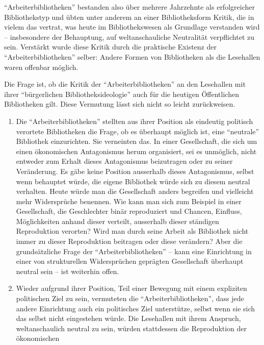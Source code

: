 \documentclass[a4paper,
fontsize=11pt,
oneside,
numbers=noperiodatend,
parskip=half-,
bibliography=totoc,
final
]{scrartcl}
\begin{document}
\enquote{Arbeiterbibliotheken} bestanden also über mehrere Jahrzehnte
als erfolgreicher Bibliothekstyp und übten unter anderem an einer
Bibliotheksform Kritik, die in vielem das vertrat, was heute im
Bibliothekswesen als Grundlage verstanden wird -- insbesondere der
Behauptung, auf weltanschauliche Neutralität verpflichtet zu sein.
Verstärkt wurde diese Kritik durch die praktische Existenz der
\enquote{Arbeiterbibliotheken} selber: Andere Formen von Bibliotheken
als die Lesehallen waren offenbar möglich.

Die Frage ist, ob die Kritik der \enquote{Arbeiterbibliotheken} an den
Lesehallen mit ihrer \enquote{bürgerlichen Bibliotheksideologie} auch
für die heutigen Öffentlichen Bibliotheken gilt. Diese Vermutung lässt
sich nicht so leicht zurückweisen.

\begin{enumerate}
\def\labelenumi{(\arabic{enumi})}
\item
  Die \enquote{Arbeiterbibliotheken} stellten aus ihrer Position als
  eindeutig politisch verortete Bibliotheken die Frage, ob es überhaupt
  möglich ist, eine \enquote{neutrale} Bibliothek einzurichten. Sie
  verneinten das. In einer Gesellschaft, die sich um einen ökonomischen
  Antagonismus herum organisiert, sei es unmöglich, nicht entweder zum
  Erhalt dieses Antagonismus beizutragen oder zu seiner Veränderung. Es
  gäbe keine Position ausserhalb dieses Antagonismus, selbst wenn
  behauptet würde, die eigene Bibliothek würde sich zu diesem neutral
  verhalten. Heute würde man die Gesellschaft anders begreifen und
  vielleicht mehr Widersprüche benennen. Wie kann man sich zum Beispiel
  in einer Gesellschaft, die Geschlechter binär reproduziert und
  Chancen, Einfluss, Möglichkeiten anhand dieser verteilt, ausserhalb
  dieser ständigen Reproduktion verorten? Wird man durch seine Arbeit
  als Bibliothek nicht immer zu dieser Reproduktion beitragen oder diese
  verändern? Aber die grundsätzliche Frage der
  \enquote{Arbeiterbibliotheken} -- kann eine Einrichtung in einer von
  strukturellen Widersprüchen geprägten Gesellschaft überhaupt neutral
  sein -- ist weiterhin offen.
\item
  Wieder aufgrund ihrer Position, Teil einer Bewegung mit einem
  expliziten politischen Ziel zu sein, vermuteten die
  \enquote{Arbeiterbibliotheken}, dass jede andere Einrichtung auch ein
  politisches Ziel unterstütze, selbst wenn sie sich das selbst nicht
  eingestehen würde. Die Lesehallen mit ihrem Anspruch, weltanschaulich
  neutral zu sein, würden stattdessen die Reproduktion der ökonomischen

\end{enumerate}
\end{document}
